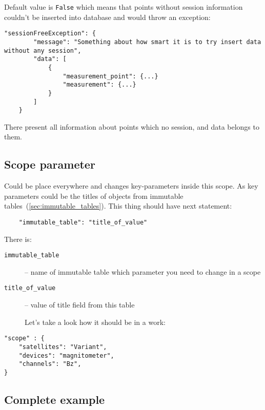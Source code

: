 \documentclass{article}
\begin{document}
Default value is \texttt{False} which means that points without session information couldn't be inserted into database and would throw an exception:

\begin{lstlisting}[caption=Example of exception]
    "sessionFreeException": {
        "message": "Something about how smart it is to try insert data without any session",
        "data": [
            {
                "measurement_point": {...}
                "measurement": {...}
            }
        ]
    }
\end{lstlisting}

There present all information about points which no session, and data belongs to them.

    \subsection{Scope parameter}
    
Could be place everywhere and changes key-parameters inside this scope. As key parameters could be the titles of objects from {immutable tables}~(\ref{sec:immutable_tables}). This thing should have next statement:

\begin{lstlisting}
    "immutable_table": "title_of_value"
\end{lstlisting}

There is:
\begin{description}
    \item[\texttt{immutable{\_}table}] -- name of immutable table which parameter you need to change in a scope
    \item[\texttt{title{\_}of{\_}value}] -- value of title field from this table
    
    Let's take a look how it should be in a work:
\end{description}

\begin{lstlisting}[caption=Scope parameter]
"scope" : {
    "satellites": "Variant",
    "devices": "magnitometer",
    "channels": "Bz",
}
\end{lstlisting}

    \subsection{Complete example}
    
\end{document}
